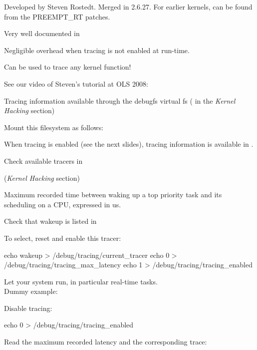   \startitemize
  \item Developed by Steven Rostedt. Merged in 2.6.27. For earlier
    kernels, can be found from the PREEMPT\_RT patches.
  \item Very well documented in 
  \item Negligible overhead when tracing is not enabled at run-time.
  \item Can be used to trace any kernel function!
  \item See our video of Steven's tutorial at OLS 2008:\\
  \stopitemize

  \startitemize
  \item Tracing information available through the debugfs virtual fs
    ( in the {\em Kernel Hacking} section)
  \item Mount this filesystem as follows:\\
  \item When tracing is enabled (see the next slides), tracing
    information is available in .
  \item Check available tracers in
  \stopitemize

  \small
   ({\em Kernel Hacking} section)
  \startitemize
  \item Maximum recorded time between waking up a top priority task
    and its scheduling on a CPU, expressed in us.
  \item Check that wakeup is listed in
  \item To select, reset and enable this tracer:
    \begin{block}{}
\starttyping
echo wakeup > /debug/tracing/current_tracer
echo 0 > /debug/tracing/tracing_max_latency
echo 1 > /debug/tracing/tracing_enabled
\stoptyping
\small
    \end{block}
  \item Let your system run, in particular real-time tasks.\\
    Dummy example: 
  \item Disable tracing:\\
    \begin{block}{}
\starttyping
echo 0 > /debug/tracing/tracing_enabled
\stoptyping
\small
    \end{block}{}
  \item Read the maximum recorded latency and the corresponding trace:\\
  \stopitemize

